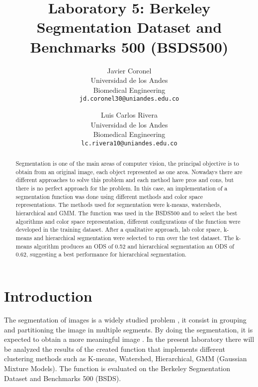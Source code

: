 \documentclass[10pt,twocolumn,letterpaper]{article}
\begin{document}
\title{Laboratory 5: Berkeley Segmentation Dataset and Benchmarks 500 (BSDS500)}

\author{Javier Coronel\\
Universidad de los Andes\\
Biomedical Engineering\\
{\tt\small jd.coronel30@uniandes.edu.co}
\and
Luis Carlos Rivera \\
Universidad de los Andes\\
Biomedical Engineering\\
{\tt\small lc.rivera10@uniandes.edu.co}
}

\maketitle

\begin{abstract}
Segmentation is one of the main areas of computer vision, the principal objective  is to obtain from an original image, each object represented as one area. Nowadays there are different approaches to solve this problem and each method have pros and cons, but there is no perfect approach for the problem. In this case, an implementation of a segmentation function was done using different methods and color space representations. The methods used for segmentation were k-means, watersheds, hierarchical and GMM. The function was used in the BSDS500 and to select the best algorithms and color space representation, different configurations of the function were developed in the training dataset. After a qualitative approach, lab color space, k-means and hierarchical segmentation were selected to run over the test dataset. The k-means algorithm produces an ODS of 0.52 and hierarchical segmentation an ODS of 0.62, suggesting a best performance for hierarchical segmentation.
\end{abstract}

\section{Introduction}
The segmentation of images is a widely studied problem \cite{brice,rouss3}, it consist in grouping and partitioning the image in multiple segments. By doing the segmentation, it is expected to obtain a more meaningful image \cite{shapiro}. In the present laboratory there will be analyzed the results of the created function that implements different clustering methods such as K-means, Watershed, Hierarchical, GMM (Gaussian Mixture Models). The function is evaluated on the Berkeley Segmentation Dataset and Benchmarks 500 (BSDS).
\end{document}
